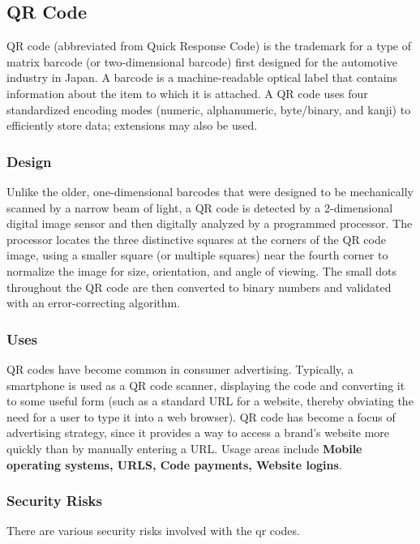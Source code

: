 \documentclass[12pt,journal,compsoc]{IEEEtran}
\begin{document}
\subsection{QR Code}
QR code (abbreviated from Quick Response Code) is the trademark for a type of matrix barcode (or two-dimensional barcode) first designed for the automotive industry in Japan. A barcode is a machine-readable optical label that contains information about the item to which it is attached. A QR code uses four standardized encoding modes (numeric, alphanumeric, byte/binary, and kanji) to efficiently store data; extensions may also be used.


\subsubsection{Design}

Unlike the older, one-dimensional barcodes that were designed to be mechanically scanned by a narrow beam of light, a QR code is detected by a 2-dimensional digital image sensor and then digitally analyzed by a programmed processor. The processor locates the three distinctive squares at the corners of the QR code image, using a smaller square (or multiple squares) near the fourth corner to normalize the image for size, orientation, and angle of viewing. The small dots throughout the QR code are then converted to binary numbers and validated with an error-correcting algorithm.


\subsubsection{Uses}

QR codes have become common in consumer advertising. Typically, a smartphone is used as a QR code scanner, displaying the code and converting it to some useful form (such as a standard URL for a website, thereby obviating the need for a user to type it into a web browser). QR code has become a focus of advertising strategy, since it provides a way to access a brand's website more quickly than by manually entering a URL. Usage areas include \textbf{Mobile operating systems, URLS, Code payments, Website logins}.

\subsubsection{Security Risks}

There are various security risks involved with the qr codes.
\end{document}
